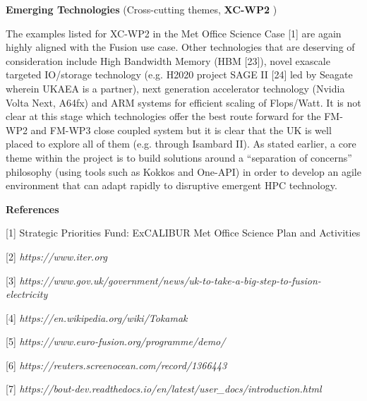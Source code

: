 \documentclass{article}
\begin{document}
\vspace{14pt}
{\color{color25} \textbf{Emerging Technologies}}{\color{color25}  (Cross-cutting 
themes, }{\color{color25} \textbf{XC-WP2}}{\color{color25} )}

\vspace{14pt}
{\color{color29} The examples listed for XC-WP2 in the Met Office Science Case 
[1] are again highly aligned with the Fusion use case. Other technologies that 
are deserving of consideration include High Bandwidth Memory (HBM [23]), novel 
exascale targeted IO/storage technology (e.g. H2020 project SAGE II [24] led by 
Seagate wherein UKAEA is a partner), next generation accelerator technology (Nvidia 
Volta Next, A64fx) and ARM systems for efficient scaling of Flops/Watt. It is not 
clear at this stage which technologies offer the best route forward for the FM-WP2 
and FM-WP3 close coupled system but it is clear that the UK is well placed to explore 
all of them (e.g. through Isambard II). As stated earlier, a core theme within 
the project is to build solutions around a ``separation of concerns'' philosophy 
(using tools such as Kokkos and One-API) in order to develop an agile environment 
that can adapt rapidly to disruptive emergent HPC technology.}

\vspace{53pt}
{\huge{}{\color{color25} \textbf{References}}}

\vspace{14pt}
{\color{color29} [1]  }Strategic Priorities Fund: ExCALIBUR Met Office Science 
Plan and Activities

\vspace{2pt}
[2]  {\color{color23} \emph{https://www.iter.org}}

\vspace{2pt}
[3]  {\color{color23} \emph{https://www.gov.uk/government/news/uk-to-take-a-big-step-to-fusion-electricity}}

\vspace{2pt}
{\color{color29} [4]  }{\color{color23} \emph{https://en.wikipedia.org/wiki/Tokamak}}

\vspace{2pt}
[5]  {\color{color23} \emph{https://www.euro-fusion.org/programme/demo/}}

\vspace{2pt}
[6]  {\color{color23} \emph{https://reuters.screenocean.com/record/1366443}}

\vspace{2pt}
[7]  {\color{color23} \emph{https://bout-dev.readthedocs.io/en/latest/user\_docs/introduction.html}}
\end{document}
